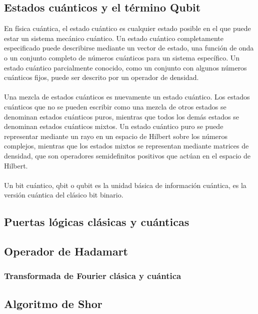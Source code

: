\subsection{Estados cuánticos y el término Qubit}
En física cuántica, el estado cuántico es cualquier estado posible en el que puede estar un sistema mecánico cuántico. Un estado cuántico completamente especificado puede describirse mediante un vector de estado, una función de onda o un conjunto completo de números cuánticos para un sistema específico. Un estado cuántico parcialmente conocido, como un conjunto con algunos números cuánticos fijos, puede ser descrito por un operador de densidad.\\\\
Una mezcla de estados cuánticos es nuevamente un estado cuántico. Los estados cuánticos que no se pueden escribir como una mezcla de otros estados se denominan estados cuánticos puros, mientras que todos los demás estados se denominan estados cuánticos mixtos. Un estado cuántico puro se puede representar mediante un rayo en un espacio de Hilbert sobre los números complejos, mientras que los estados mixtos se representan mediante matrices de densidad, que son operadores semidefinitos positivos que actúan en el espacio de Hilbert.\\\\
Un bit cuántico, qbit o qubit es la unidad básica de información cuántica, es la versión cuántica del clásico bit binario.
\subsection{Puertas lógicas clásicas y cuánticas}
\subsection{Operador de Hadamart}
\subsubsection{Transformada de Fourier clásica y cuántica}
\subsection{Algoritmo de Shor}

